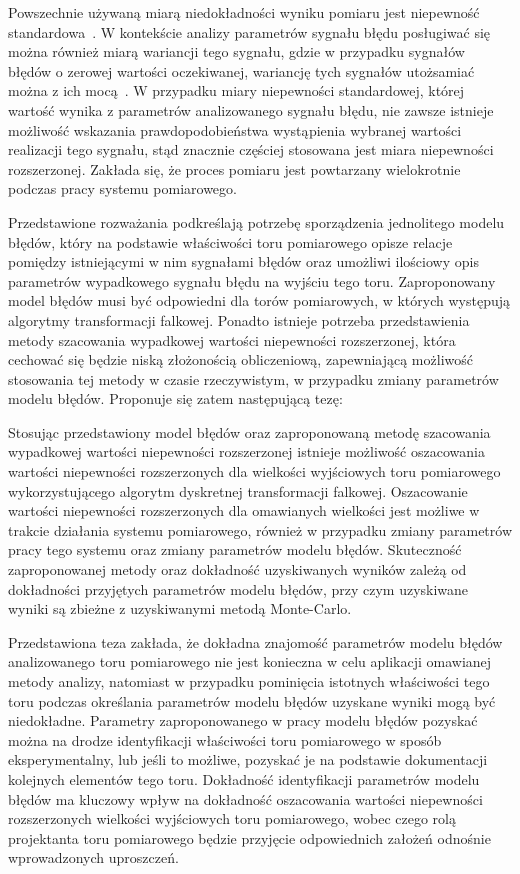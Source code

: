 Powszechnie używaną miarą niedokładności wyniku pomiaru jest niepewność standardowa~\cite{jcgm_guide}. W kontekście analizy parametrów sygnału błędu posługiwać się można również miarą wariancji tego sygnału, gdzie w przypadku sygnałów błędów o zerowej wartości oczekiwanej, wariancję tych sygnałów utożsamiać można z ich mocą~\cite{oppenheim_sns}. W przypadku miary niepewności standardowej, której wartość wynika z parametrów analizowanego sygnału błędu, nie zawsze istnieje możliwość wskazania prawdopodobieństwa wystąpienia wybranej wartości realizacji tego sygnału, stąd znacznie częściej stosowana jest miara niepewności rozszerzonej. Zakłada się, że proces pomiaru jest powtarzany wielokrotnie podczas pracy systemu pomiarowego.

Przedstawione rozważania podkreślają potrzebę sporządzenia jednolitego modelu błędów, który na podstawie właściwości toru pomiarowego opisze relacje pomiędzy istniejącymi w nim sygnałami błędów oraz umożliwi ilościowy opis parametrów wypadkowego sygnału błędu na wyjściu tego toru. Zaproponowany model błędów musi być odpowiedni dla torów pomiarowych, w których występują algorytmy transformacji falkowej. Ponadto istnieje potrzeba przedstawienia metody szacowania wypadkowej wartości niepewności rozszerzonej, która cechować się będzie niską złożonością obliczeniową, zapewniającą możliwość stosowania tej metody w czasie rzeczywistym, w przypadku zmiany parametrów modelu błędów. Proponuje się zatem następującą tezę:

\begin{quoting}[font = bfseries]
Stosując przedstawiony model błędów oraz zaproponowaną metodę szacowania wypadkowej wartości niepewności rozszerzonej istnieje możliwość oszacowania wartości niepewności rozszerzonych dla wielkości wyjściowych toru pomiarowego wykorzystującego algorytm dyskretnej transformacji falkowej. Oszacowanie wartości niepewności rozszerzonych dla omawianych wielkości jest możliwe w trakcie działania systemu pomiarowego, również w przypadku zmiany parametrów pracy tego systemu oraz zmiany parametrów modelu błędów. Skuteczność zaproponowanej metody oraz dokładność uzyskiwanych wyników zależą od dokładności przyjętych parametrów modelu błędów, przy czym uzyskiwane wyniki są zbieżne z uzyskiwanymi metodą Monte-Carlo.
\end{quoting}

Przedstawiona teza zakłada, że dokładna znajomość parametrów modelu błędów analizowanego toru pomiarowego nie jest konieczna w celu aplikacji omawianej metody analizy, natomiast w przypadku pominięcia istotnych właściwości tego toru podczas określania parametrów modelu błędów uzyskane wyniki mogą być niedokładne. Parametry zaproponowanego w pracy modelu błędów pozyskać można na drodze identyfikacji właściwości toru pomiarowego w sposób eksperymentalny, lub jeśli to możliwe, pozyskać je na podstawie dokumentacji kolejnych elementów tego toru. Dokładność identyfikacji parametrów modelu błędów ma kluczowy wpływ na dokładność oszacowania wartości niepewności rozszerzonych wielkości wyjściowych toru pomiarowego, wobec czego rolą projektanta toru pomiarowego będzie przyjęcie odpowiednich założeń odnośnie wprowadzonych uproszczeń.

